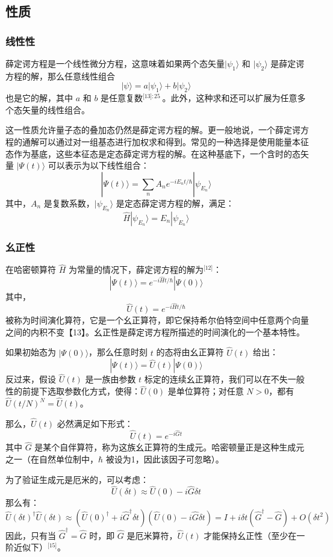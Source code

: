 \subsection{性质}
\subsubsection{线性性}
薛定谔方程是一个线性微分方程，这意味着如果两个态矢量$|\psi_1\rangle$ 和 $|\psi_2\rangle$ 是薛定谔方程的解，那么任意线性组合
$$
|\psi\rangle = a|\psi_1\rangle + b|\psi_2\rangle~
$$
也是它的解，其中 $a$ 和 $b$ 是任意复数\(^\text{[13]: 25   }\)。此外，这种求和还可以扩展为任意多个态矢量的线性组合。

这一性质允许量子态的叠加态仍然是薛定谔方程的解。更一般地说，一个薛定谔方程的通解可以通过对一组基态进行加权求和得到。常见的一种选择是使用能量本征态作为基底，这些本征态是定态薛定谔方程的解。在这种基底下，一个含时的态矢量 $|\Psi(t)\rangle$ 可以表示为以下线性组合：
$$
|\Psi(t)\rangle = \sum_n A_n e^{-iE_n t/\hbar} |\psi_{E_n}\rangle~
$$
其中，$A_n$ 是复数系数，$|\psi_{E_n}\rangle$ 是定态薛定谔方程的解，满足：
$$
\hat{H}|\psi_{E_n}\rangle = E_n |\psi_{E_n}\rangle~
$$
\subsubsection{幺正性}
在哈密顿算符 $\hat{H}$ 为常量的情况下，薛定谔方程的解为\(^\text{[12]}\)：
$$
|\Psi(t)\rangle = e^{-i\hat{H}t/\hbar} |\Psi(0)\rangle~
$$
其中，
$$
\hat{U}(t) = e^{-i\hat{H}t/\hbar}~
$$
被称为时间演化算符，它是一个幺正算符，即它保持希尔伯特空间中任意两个向量之间的内积不变【13】。幺正性是薛定谔方程所描述的时间演化的一个基本特性。

如果初始态为 $|\Psi(0)\rangle$，那么任意时刻 $t$ 的态将由幺正算符 $\hat{U}(t)$ 给出：
$$
|\Psi(t)\rangle = \hat{U}(t) |\Psi(0)\rangle~
$$
反过来，假设 $\hat{U}(t)$ 是一族由参数 $t$ 标定的连续幺正算符，我们可以在不失一般性的前提下选取参数化方式，使得：$\hat{U}(0)$ 是单位算符；对任意 $N > 0$，都有 $\hat{U}(t/N)^N = \hat{U}(t)$。

那么，$\hat{U}(t)$ 必然满足如下形式：
$$
\hat{U}(t) = e^{-i\hat{G}t}~
$$
其中 $\hat{G}$ 是某个自伴算符，称为这族幺正算符的生成元。哈密顿量正是这种生成元之一（在自然单位制中，$\hbar$ 被设为1，因此该因子可忽略）。

为了验证生成元是厄米的，可以考虑：
$$
\hat{U}(\delta t) \approx \hat{U}(0) - i\hat{G} \delta t~
$$
那么有：
$$
\hat{U}(\delta t)^\dagger \hat{U}(\delta t) \approx (\hat{U}(0)^\dagger + i\hat{G}^\dagger \delta t)(\hat{U}(0) - i\hat{G} \delta t) = I + i\delta t(\hat{G}^\dagger - \hat{G}) + O(\delta t^2)~
$$
因此，只有当 $\hat{G}^\dagger = \hat{G}$ 时，即 $\hat{G}$ 是厄米算符，$\hat{U}(t)$ 才能保持幺正性（至少在一阶近似下）\(^\text{[15]}\)。
